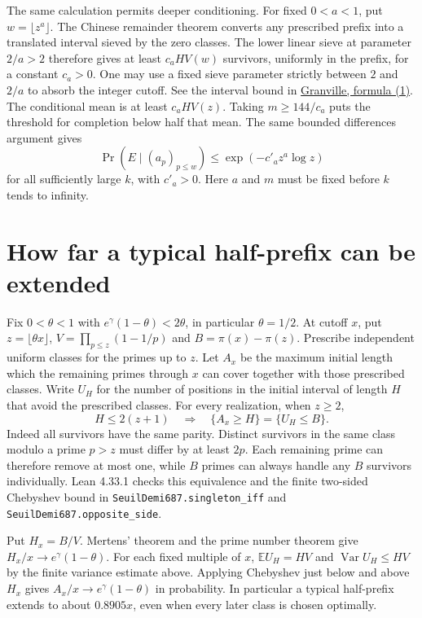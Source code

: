 \documentclass[11pt]{article}
\begin{document}
The same calculation permits deeper conditioning. For fixed $0<a<1$,
put $w=\lfloor z^a\rfloor$. The Chinese remainder theorem converts any
prescribed prefix into a translated interval sieved by the zero classes.
The lower linear sieve at parameter $2/a>2$ therefore gives at least
$c_a H V(w)$ survivors, uniformly in the prefix, for a constant $c_a>0$.
One may use a fixed sieve parameter strictly between $2$ and $2/a$ to
absorb the integer cutoff. See the interval bound in
\href{https://arxiv.org/abs/2010.01211}{Granville, formula (1)}.
The conditional mean is at least $c_a H V(z)$. Taking $m\ge144/c_a$
puts the threshold for completion below half that mean. The same
bounded differences argument gives
\[
    \Pr(E\mid (a_p)_{p\le w})\le \exp(-c'_a z^a\log z)
\]
for all sufficiently large $k$, with $c'_a>0$. Here $a$ and $m$ must
be fixed before $k$ tends to infinity.

\section*{How far a typical half-prefix can be extended}
Fix $0<\theta<1$ with $e^\gamma(1-\theta)<2\theta$, in particular
$\theta=1/2$. At cutoff $x$, put $z=\lfloor\theta x\rfloor$,
$V=\prod_{p\le z}(1-1/p)$ and $B=\pi(x)-\pi(z)$. Prescribe
independent uniform classes for the primes up to $z$. Let $A_x$ be the
maximum initial length which the remaining primes through $x$ can
cover together with those prescribed classes. Write $U_H$ for the
number of positions in the initial interval of length $H$ that avoid
the prescribed classes. For every realization, when $z\ge2$,
\[
       H\le 2(z+1) \quad\Longrightarrow\quad
       \{A_x\ge H\}=\{U_H\le B\}.
\]
Indeed all survivors have the same parity. Distinct survivors in the
same class modulo a prime $p>z$ must differ by at least $2p$. Each
remaining prime can therefore remove at most one, while $B$ primes
can always handle any $B$ survivors individually.
Lean 4.33.1 checks this equivalence and the finite two-sided
Chebyshev bound in \texttt{SeuilDemi687.singleton\_iff} and
\texttt{SeuilDemi687.opposite\_side}.

Put $H_x=B/V$. Mertens' theorem and the prime number theorem give
$H_x/x\to e^\gamma(1-\theta)$. For each fixed multiple of $x$,
$\mathbb E U_H=HV$ and $\operatorname{Var}U_H\le HV$ by the finite
variance estimate above. Applying Chebyshev just below and above
$H_x$ gives $A_x/x\to e^\gamma(1-\theta)$ in probability. In
particular a typical half-prefix extends to about $0.8905x$, even
when every later class is chosen optimally.
\end{document}
